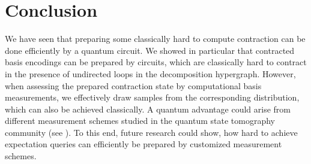 \section{Conclusion}


We have seen that preparing some classically hard to compute contraction can be done efficiently by a quantum circuit.
We showed in particular that contracted basis encodings can be prepared by circuits, which are classically hard to contract in the presence of undirected loops in the decomposition hypergraph.
However, when assessing the prepared contraction state by computational basis measurements, we effectively draw samples from the corresponding distribution, which can also be achieved classically.
A quantum advantage could arise from different measurement schemes studied in the quantum state tomography community (see \cite{gross_quantum_2010,cramer_efficient_2010,roth_semi-device-dependent_2023}).
To this end, future research could show, how hard to achieve expectation queries can efficiently be prepared by customized measurement schemes.